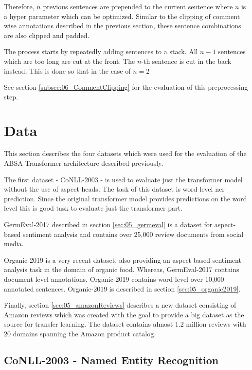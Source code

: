 Therefore, $n$ previous sentences are prepended to the current sentence where $n$ is a hyper parameter which can be optimized. Similar to the clipping of comment wise annotations described in the previous section, these sentence combinations are also clipped and padded. 
\medskip

The process starts by repeatedly adding sentences to a stack. All $n-1$ sentences which are too long are cut at the front. The $n$-th sentence is cut in the back instead. This is done so that in the case of $n=2$ 


See section \ref{subsec:06_CommentClipping} for the evaluation of this preprocessing step.

\section{Data}
\label{sec:05_Data}

This section describes the four datasets which were used for the evaluation of the ABSA-Transformer architecture described previously.

The first dataset - CoNLL-2003 - is used to evaluate just the transformer model without the use of aspect heads. The task of this dataset is word level \gls{ner} prediction. Since the original transformer model provides predictions on the word level this is good task to evaluate just the transformer part.
\medskip

GermEval-2017 described in section \ref{sec:05_germeval} is a dataset for aspect-based sentiment analysis and contains over 25,000 review documents from social media.
\medskip

Organic-2019 is a very recent dataset, also providing an aspect-based sentiment analysis task in the domain of organic food. Whereas, GermEval-2017 contains document level annotations, Organic-2019 contains word level over 10,000 annotated sentences. Organic-2019 is described in section \ref{sec:05_organic2019}.
\medskip

Finally, section \ref{sec:05_amazonReviews} describes a new dataset consisting of Amazon reviews which was created with the goal to provide a big dataset as the source for transfer learning. The dataset contains almost 1.2 million reviews with 20 domains spanning the Amazon product catalog.

\subsection{CoNLL-2003 - Named Entity Recognition}

